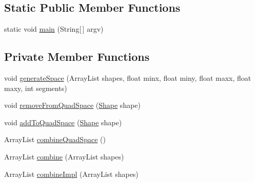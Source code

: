 \subsection*{Static Public Member Functions}
\begin{DoxyCompactItemize}
\item 
static void \mbox{\hyperlink{classorg_1_1newdawn_1_1slick_1_1tests_1_1_geom_util_tile_test_a0aa7ad66a594846606ede3e169e0d840}{main}} (String\mbox{[}$\,$\mbox{]} argv)
\end{DoxyCompactItemize}
\subsection*{Private Member Functions}
\begin{DoxyCompactItemize}
\item 
void \mbox{\hyperlink{classorg_1_1newdawn_1_1slick_1_1tests_1_1_geom_util_tile_test_aa906ef65f73c421c065739f34f61b1c1}{generate\+Space}} (Array\+List shapes, float minx, float miny, float maxx, float maxy, int segments)
\item 
void \mbox{\hyperlink{classorg_1_1newdawn_1_1slick_1_1tests_1_1_geom_util_tile_test_a0c5b1d585e90c83539103524fa97a4dd}{remove\+From\+Quad\+Space}} (\mbox{\hyperlink{classorg_1_1newdawn_1_1slick_1_1geom_1_1_shape}{Shape}} shape)
\item 
void \mbox{\hyperlink{classorg_1_1newdawn_1_1slick_1_1tests_1_1_geom_util_tile_test_a64816ab56aab3b521d618968ead37055}{add\+To\+Quad\+Space}} (\mbox{\hyperlink{classorg_1_1newdawn_1_1slick_1_1geom_1_1_shape}{Shape}} shape)
\item 
Array\+List \mbox{\hyperlink{classorg_1_1newdawn_1_1slick_1_1tests_1_1_geom_util_tile_test_a3ef7545af9fc15917a44d878e747e051}{combine\+Quad\+Space}} ()
\item 
Array\+List \mbox{\hyperlink{classorg_1_1newdawn_1_1slick_1_1tests_1_1_geom_util_tile_test_a41d402067bc3c606e6b2dbdac3f12ebb}{combine}} (Array\+List shapes)
\item 
Array\+List \mbox{\hyperlink{classorg_1_1newdawn_1_1slick_1_1tests_1_1_geom_util_tile_test_afce35caf51d06168a46f817753b326a8}{combine\+Impl}} (Array\+List shapes)
\end{DoxyCompactItemize}
